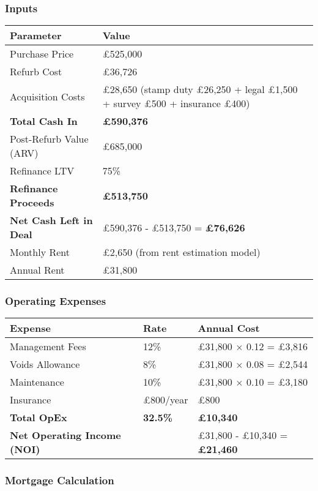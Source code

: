 \documentclass[11pt,a4paper]{article}
\begin{document}
\subsubsection{Inputs}

\begin{longtable}{@{}p{5cm}p{9cm}@{}}
\toprule
\textbf{Parameter} & \textbf{Value} \\
\midrule
Purchase Price & £525,000 \\
Refurb Cost & £36,726 \\
Acquisition Costs & £28,650 (stamp duty £26,250 + legal £1,500 + survey £500 + insurance £400) \\
\textbf{Total Cash In} & \textbf{£590,376} \\
\addlinespace
Post-Refurb Value (ARV) & £685,000 \\
Refinance LTV & 75\% \\
\textbf{Refinance Proceeds} & \textbf{£513,750} \\
\addlinespace
\textbf{Net Cash Left in Deal} & £590,376 - £513,750 = \textbf{£76,626} \\
\addlinespace
Monthly Rent & £2,650 (from rent estimation model) \\
Annual Rent & £31,800 \\
\bottomrule
\end{longtable}

\subsubsection{Operating Expenses}

\begin{longtable}{@{}p{5cm}p{3cm}p{5.5cm}@{}}
\toprule
\textbf{Expense} & \textbf{Rate} & \textbf{Annual Cost} \\
\midrule
Management Fees & 12\% & £31,800 × 0.12 = £3,816 \\
Voids Allowance & 8\% & £31,800 × 0.08 = £2,544 \\
Maintenance & 10\% & £31,800 × 0.10 = £3,180 \\
Insurance & £800/year & £800 \\
\textbf{Total OpEx} & \textbf{32.5\%} & \textbf{£10,340} \\
\addlinespace
\textbf{Net Operating Income (NOI)} & & £31,800 - £10,340 = \textbf{£21,460} \\
\bottomrule
\end{longtable}

\subsubsection{Mortgage Calculation}
\end{document}
